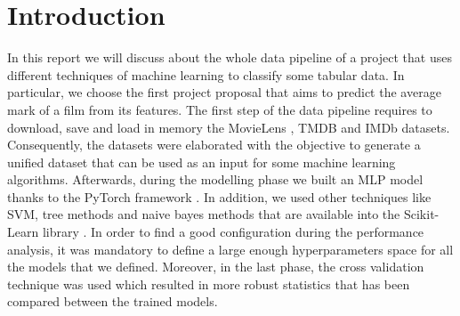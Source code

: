 \documentclass[../main]{subfiles}
\begin{document}
\chapter{Introduction}
In this report we will discuss about the whole data pipeline of a project that uses different techniques of machine learning to classify some tabular data.
In particular, we choose the first project proposal that aims to predict the average mark of a film from its features.
The first step of the data pipeline requires to download, save and load in memory the MovieLens \cite{site:movielens-datasets}, TMDB \cite{site:tmdb-api-overview} and IMDb \cite{site:imdb-datasets} datasets.  
Consequently, the datasets were elaborated with the objective to generate a unified dataset that can be used as an input for some machine learning algorithms.
Afterwards, during the modelling phase we built an MLP model thanks to the PyTorch framework \cite{NEURIPS2019_9015}.
In addition, we used other techniques like SVM, tree methods and naive bayes methods that are available into the Scikit-Learn library \cite{scikit-learn}. 
In order to find a good configuration during the performance analysis, it was mandatory to define a large enough hyperparameters space for all the models that we defined.
Moreover, in the last phase, the cross validation technique was used which resulted in more robust statistics that has been compared between the trained models.
\end{document}
